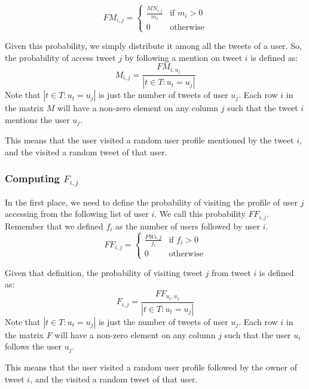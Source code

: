 \documentclass[12pt,a4paper]{article}
\begin{document}
\begin{equation}
FM_{i,j} = \begin{cases}
\frac{MN_{i,j}}{m_i} & \text{if } m_i > 0 \\
0 & \text{otherwise}
\end{cases}
\end{equation}

Given this probability, we simply distribute it among all the tweets of a user. So, the probability of access tweet $j$ by following a mention on tweet $i$ is defined as:
\begin{equation}
M_{i,j} = \frac{FM_{i, u_j}}{ |t \in T : u_t = u_j|}
\end{equation}
Note that $|t \in T : u_t = u_j|$ is just the number of tweets of user $u_j$. Each row $i$ in the matrix $M$ will have a non-zero element on any column $j$ such that the tweet $i$ mentions the user $u_j$.

This means that the user visited a random user profile mentioned by the tweet $i$, and the visited a random tweet of that user. 

\subsubsection*{Computing $F_{i,j}$}
In the first place, we need to define the probability of visiting the profile of user $j$ accessing from the following list of user $i$. We call this probability $FF_{i,j}$. Remember that we defined $f_i$ as the number of users followed by user $i$.
\begin{equation}
FF_{i,j} = \begin{cases}
\frac{FW{i,j}}{f_i} & \text{if } f_i > 0 \\
0 & \text{otherwise}
\end{cases}
\end{equation}

Given that definition, the probability of visiting tweet $j$ from tweet $i$ is defined as:
\begin{equation}
F_{i,j} = \frac{FF_{u_i, u_j}}{ |t \in T : u_t = u_j|}
\end{equation}
Note that $|t \in T : u_t = u_j|$ is just the number of tweets of user $u_j$. Each row $i$ in the matrix $F$ will have a non-zero element on any column $j$ such that the user $u_i$ follows the user $u_j$.

This means that the user visited a random user profile followed by the owner of tweet $i$, and the visited a random tweet of that user. 
\end{document}
